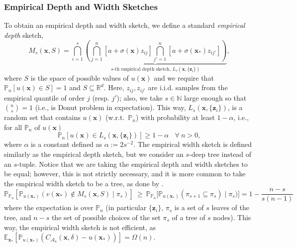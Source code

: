 \documentclass{article} %
\theoremstyle{remark}
\theoremstyle{definition}      %
\begin{document}
\subsubsection{Empirical Depth and Width Sketches} 
To obtain an empirical depth and width sketch, we define a standard \emph{empirical depth} sketch,
\begin{equation} \label{eq:width_sketch_bias}
  M_s(\bm{x}, S)  =   \bigcap_{i=1}^{s} \underbrace{\left(\bigcap_{j=1}^{n} \left[a + \sigma(\bm{x}) z_{ij}\right] \bigcap_{j'=1}^{n} \left[a + \sigma(\bm{x_*}) z_{ij'}\right] \right)}_{\text{$s$-th empirical depth sketch, }L_s(\bm{x},\{ \bm{z}_i \})},  
\end{equation}
where $S$ is the space of possible values of $u(\bm{x})$ and we require that $\mathbb{P}_n[ u(\bm{x}) \in S] = 1$ and $S \subseteq \mathbb{R}^d$. Here, $z_{ij},z_{ij'}$ are i.i.d. samples from the empirical quantile of order $j$ (resp. $j'$); also, we take $s \in \mathbb{N}$ large enough so that $\binom{n}{s} = 1$ (i.e., is Donut problem in expectation). This way, $L_s(\bm{x},\{ \bm{z}_i \})$, is a random set that contains $u(\bm{x})$ (w.r.t.~$\mathbb{P}_n$) with probability at least $1 - \alpha$, i.e., 
for all $\mathbb{P}_n$ of $u(\bm{x})$ 
\begin{equation}
  \mathbb{P}_n[ u(\bm{x}) \in L_s(\bm{x},\{ \bm{z}_i \})] \geq 1 - \alpha  ~~~~\forall ~n > 0,
\end{equation}
where $\alpha$ is a constant defined as $\alpha := 2s^{-2}$. 
The empirical width sketch is defined similarly as the empirical depth sketch, but we consider an $s$-deep tree instead of an $s$-tuple. 
Notice that we are taking the empirical depth and width sketches to be equal; however, this is not strictly necessary, and it is more common to take the empirical width sketch to be a tree, as done by \citet{guttman1970statistical}. 
\begin{equation} 
\label{eq:width_sketch_bias2}
{ \mathbb{P}_{\mathbb{P}_{n}}[\mathbb{P}_{u(\bm{x_*})}(v(\bm{x_*}) \notin M_s(\bm{x},S) \mid \pi_s) ]~ \geq ~ \mathbb{P}_{\mathbb{P}_{n}}[\mathbb{P}_{u(\bm{x_*})}(\pi_{s+1} \subseteq \pi_{s}) \mid \pi_s}) ] = 1 - \frac{n-s}{s(n-1)}
\end{equation}
where the expectation is over $\mathbb{P}_n$ (in particular $\{ \bm {z}_i\}$, $\pi_s$ is a set of $s$ leaves of the tree, and $n-s$ the set of possible choices of the set $\pi_s$ of a tree of $s$ nodes). This way, the empirical width sketch is not efficient, as $\mathbb{E}_{\bm{x}_*}[\mathbb{P}_{u(\bm{x_*})}(C_{\mathcal{A}_n}(\bm{x},\delta) - u(\bm{x_*}))] = \Omega(n)$. 
\end{document}
